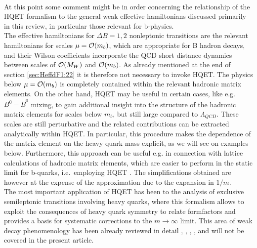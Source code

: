 \\
At this point some comment might be in order concerning the 
relationship of the HQET formalism to the general weak effective
hamiltonians discussed primarily in this review, in particular those
relevant for b-physics.
\\
The effective hamiltonians for $\Delta B=1, 2$ nonleptonic transitions
are the relevant hamiltonians for scales $\mu={\cal O}(m_b)$, which are
appropriate for B hadron decays, and their Wilson coefficients
incorporate the QCD short distance dynamics between scales of ${\cal
O}(M_W)$ and ${\cal O}(m_b)$. As already mentioned at the end of
section \ref{sec:HeffdF1:22} it is therefore not necessary to invoke
HQET. The physics below $\mu={\cal O}(m_b)$ is completely contained
within the relevant hadronic matrix elements.  On the other hand, HQET
may be useful in certain cases, like e.g.  $B^0-\bar B^0$ mixing, to
gain additional insight into the structure of the hadronic matrix
elements for scales below $m_b$, but still large compared to
$\Lambda_{QCD}$. These scales are still perturbative and the related
contributions can be extracted analytically within HQET.  In
particular, this procedure makes the dependence of the matrix element
on the heavy quark mass explicit, as we will see on examples below.
Furthermore, this approach can be useful e.g. in connection with
lattice calculations of hadronic matrix elements, which are easier to
perform in the static limit for b-quarks, i.e.\ employing HQET
\cite{sachrajda:92}. The simplifications obtained are however at the
expense of the approximation due to the expansion in $1/m$.
\\
The most important application of HQET has been to the analysis of
exclusive semileptonic transitions involving heavy quarks, where this
formalism allows to exploit the consequences of heavy quark symmetry to
relate formfactors and provides a basis for systematic corrections to the
$m\to\infty$ limit. This area of weak decay phenomenology has been already
reviewed in detail \cite{neubert:94}, \cite{georgi:91}, \cite{grinstein:91},
\cite{isgurwise:92}, \cite{mannel:93} and will not be covered
in the present article.

